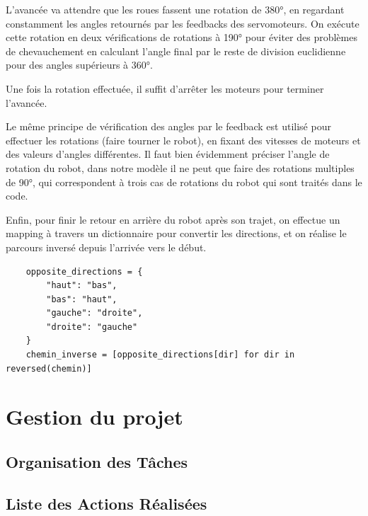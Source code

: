 \documentclass[a4paper,12pt]{report}  %
\begin{document}
L’avancée va attendre que les roues fassent une rotation de 380°, en regardant constamment les angles retournés par les feedbacks des servomoteurs. On exécute cette rotation en deux vérifications de rotations à 190° pour éviter des problèmes de chevauchement en calculant l’angle final par le reste de division euclidienne pour des angles supérieurs à 360°.

Une fois la rotation effectuée, il suffit d’arrêter les moteurs pour terminer l’avancée.

Le même principe de vérification des angles par le feedback est utilisé pour effectuer les rotations (faire tourner le robot), en fixant des vitesses de moteurs et des valeurs d’angles différentes. Il faut bien évidemment préciser l’angle de rotation du robot, dans notre modèle il ne peut que faire des rotations multiples de 90°, qui correspondent à trois cas de rotations du robot qui sont traités dans le code.

Enfin, pour finir le retour en arrière du robot après son trajet, on effectue un mapping à travers un dictionnaire pour convertir les directions, et on réalise le parcours inversé depuis l’arrivée vers le début.

\begin{lstlisting}
	opposite_directions = {
		"haut": "bas",
		"bas": "haut",
		"gauche": "droite",
		"droite": "gauche"
	}
	chemin_inverse = [opposite_directions[dir] for dir in reversed(chemin)]
\end{lstlisting}


\section{Gestion du projet}

\subsection{Organisation des Tâches} 


\subsection{Liste des Actions Réalisées}
\end{document}
